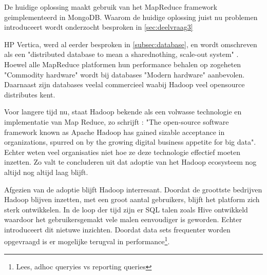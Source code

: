 De huidige oplossing maakt gebruik van het MapReduce framework geimplementeerd in MongoDB. Waarom de huidige oplossing juist nu problemen introduceert wordt onderzocht besproken in \ref{sec:deelvraag3}

HP Vertica, werd al eerder besproken in \ref{subsec:database}, en wordt omschreven als een "distributed database to mean a sharednothing, scale-out system" \parencite{lamb2012vertica}. Hoewel alle MapReduce platformen hun performance behalen op zogeheten "Commodity hardware" wordt bij databases "Modern hardware" aanbevolen. Daarnaast zijn databases veelal commercieel waabij Hadoop veel opensource distributes kent. \parencite{dean2008mapreduce}

Voor langere tijd nu, staat Hadoop bekende als een volwasse technologie en implementatie van Map Reduce, zo schrijft \textcite{hadoop2013selection}: "The open-source software framework known as Apache Hadoop has gained sizable acceptance in organizations, spurred on by the growing digital business appetite for big data". Echter weten veel organisaties niet hoe ze deze technologie effectief moeten inzetten. Zo valt te concluderen uit \textcite{hadoop2015adoption} dat adoptie van het Hadoop ecosysteem nog altijd nog altijd laag blijft.

Afgezien van de adoptie blijft Hadoop interresant. Doordat de groottste bedrijven Hadoop blijven inzetten, met een groot aantal gebruikers, blijft het platform zich sterk ontwikkelen. In de loop der tijd zijn er SQL talen zoals Hive ontwikkeld waardoor het gebruikersgemakt vele malen eenvoudiger is geworden. Echter introduceert dit nietuwe inzichten. Doordat data sets frequenter worden opgevraagd is er mogelijke terugval in performance\footnote{Lees, adhoc queryies vs reporting queries}. \parencite{thusoo2010hive}

